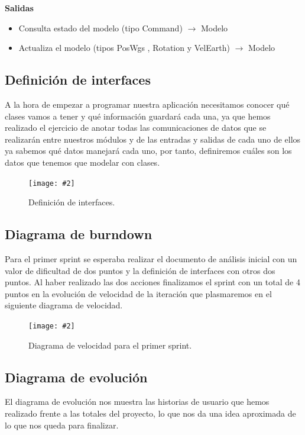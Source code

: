 \documentclass[12pt,a4paper,spanish]{book} %
\newcommand{\imgCentradaGrande}[3]{
\begin{figure}[H]
\begin{center}
\texttt{[image: \#2]}
\caption{#3}
\label{#1}
\end{center}
\end{figure}
}
\begin{document}
\begin{enumerate}
\begin{itemize}
\end{itemize}

\textbf{Salidas}

\begin{itemize}

\item Consulta estado del modelo (tipo Command) $\rightarrow$ Modelo
\item Actualiza el modelo (tipos PosWgs , Rotation y VelEarth) $\rightarrow$ Modelo

\end{itemize}

\end{enumerate}

\subsection{Definición de interfaces}

A la hora de empezar a programar nuestra aplicación necesitamos conocer qué clases vamos a tener y qué información guardará cada una, ya que hemos realizado el ejercicio de anotar todas las comunicaciones de datos que se realizarán entre nuestros módulos y de las entradas y salidas de cada uno de ellos ya sabemos qué datos manejará cada uno, por tanto, definiremos cuáles son los datos que tenemos que modelar con clases.

\imgCentradaGrande{fig.4.8}{img/definicioninterfaces.eps}{Definición de interfaces.}

\newpage
\subsection{Diagrama de burndown}

Para el primer sprint se esperaba realizar el documento de análisis inicial con un valor de dificultad de dos puntos y la definición de interfaces con otros dos puntos. Al haber realizado las dos acciones finalizamos el sprint con un total de 4 puntos en la evolución de velocidad de la iteración que plasmaremos en el siguiente diagrama de velocidad.

\imgCentradaGrande{fig.4.9}{img/diagvelocidad1.eps}{Diagrama de velocidad para el primer sprint.}

\newpage
\subsection{Diagrama de evolución}

El diagrama de evolución nos muestra las historias de usuario que hemos realizado frente a las totales del proyecto, lo que nos da una idea aproximada de lo que nos queda para finalizar.
\end{document}
